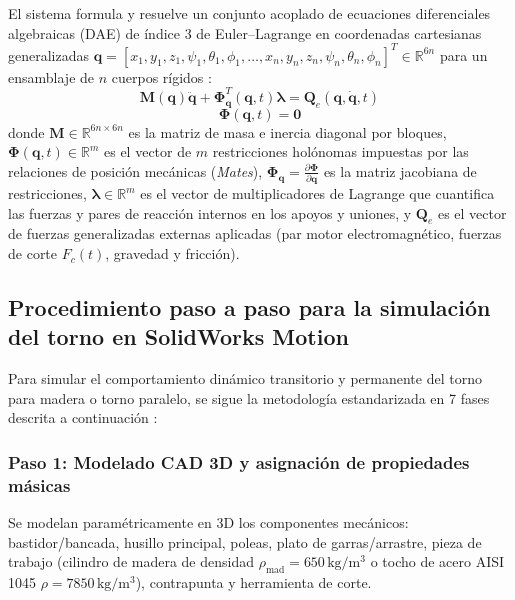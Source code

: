 \documentclass[12pt,a4paper]{article}
\begin{document}
El sistema formula y resuelve un conjunto acoplado de ecuaciones diferenciales algebraicas (DAE) de índice 3 de Euler--Lagrange en coordenadas cartesianas generalizadas $\mathbf{q} = [x_1, y_1, z_1, \psi_1, \theta_1, \phi_1, \dots, x_n, y_n, z_n, \psi_n, \theta_n, \phi_n]^T \in \mathbb{R}^{6n}$ para un ensamblaje de $n$ cuerpos rígidos \cite{nikravesh2018, shabana2020}:
\begin{equation}
    \mathbf{M}(\mathbf{q}) \ddot{\mathbf{q}} + \boldsymbol{\Phi}_{\mathbf{q}}^T(\mathbf{q}, t) \boldsymbol{\lambda} = \mathbf{Q}_e(\mathbf{q}, \dot{\mathbf{q}}, t)
    \label{eq:lagrange_dae}
\end{equation}
\begin{equation}
    \boldsymbol{\Phi}(\mathbf{q}, t) = \mathbf{0}
    \label{eq:restricciones_cinematicas}
\end{equation}
donde $\mathbf{M} \in \mathbb{R}^{6n \times 6n}$ es la matriz de masa e inercia diagonal por bloques, $\boldsymbol{\Phi}(\mathbf{q}, t) \in \mathbb{R}^m$ es el vector de $m$ restricciones holónomas impuestas por las relaciones de posición mecánicas (\textit{Mates}), $\boldsymbol{\Phi}_{\mathbf{q}} = \frac{\partial \boldsymbol{\Phi}}{\partial \mathbf{q}}$ es la matriz jacobiana de restricciones, $\boldsymbol{\lambda} \in \mathbb{R}^m$ es el vector de multiplicadores de Lagrange que cuantifica las fuerzas y pares de reacción internos en los apoyos y uniones, y $\mathbf{Q}_e$ es el vector de fuerzas generalizadas externas aplicadas (par motor electromagnético, fuerzas de corte $F_c(t)$, gravedad y fricción).

\subsection{Procedimiento paso a paso para la simulación del torno en SolidWorks Motion}
Para simular el comportamiento dinámico transitorio y permanente del torno para madera o torno paralelo, se sigue la metodología estandarizada en 7 fases descrita a continuación \cite{dassault2023}:

\subsubsection{Paso 1: Modelado CAD 3D y asignación de propiedades másicas}
Se modelan paramétricamente en 3D los componentes mecánicos: bastidor/bancada, husillo principal, poleas, plato de garras/arrastre, pieza de trabajo (cilindro de madera de densidad $\rho_{\text{mad}} = 650\,\si{\kilogram\per\cubic\meter}$ o tocho de acero AISI 1045 $\rho = 7850\,\si{\kilogram\per\cubic\meter}$), contrapunta y herramienta de corte. 
\end{document}
